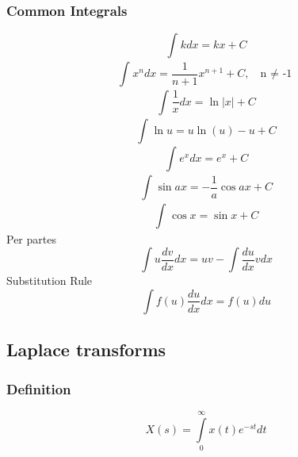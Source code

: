 \documentclass{article}
\begin{document}
		\subsubsection{Common Integrals}
			\begin{equation}
				\int_{}^{}k dx = kx + C
			\end{equation}
			\begin{equation}
				\int_{}^{}x^n dx = \frac{1}{n+1} x^{n+1} + C, \ \ \ \mbox{n $\neq$ -1}
			\end{equation}
			\begin{equation}
				\int_{}^{}\frac{1}{x} dx = \ln|x| + C
			\end{equation}
			\begin{equation}
				\int_{}^{}\ln u = u\ln(u)-u+C
			\end{equation}
			\begin{equation}
				\int_{}^{}e^x dx = e^x+C
			\end{equation}
			\begin{equation}
				\int_{}^{}\sin ax = -\frac{1}{a}\cos ax+C
			\end{equation}
			\begin{equation}
				\int_{}^{}\cos x = \sin x+C
			\end{equation}
			Per partes
			\begin{equation}
				\int {u\frac{{dv}}{{dx}}} dx = uv - \int {\frac{{du}}{{dx}}} vdx
			\end{equation}
			Substitution Rule			
			\begin{equation}
				\int {f(u)\frac{du}{dx}} dx = f(u)du
			\end{equation}
			
	\subsection{Laplace transforms}
		\subsubsection{Definition}
			\begin{equation}
				X(s) = \int\limits_0^\infty {x(t)e^{ - st} dt}
			\end{equation}
\end{document}
